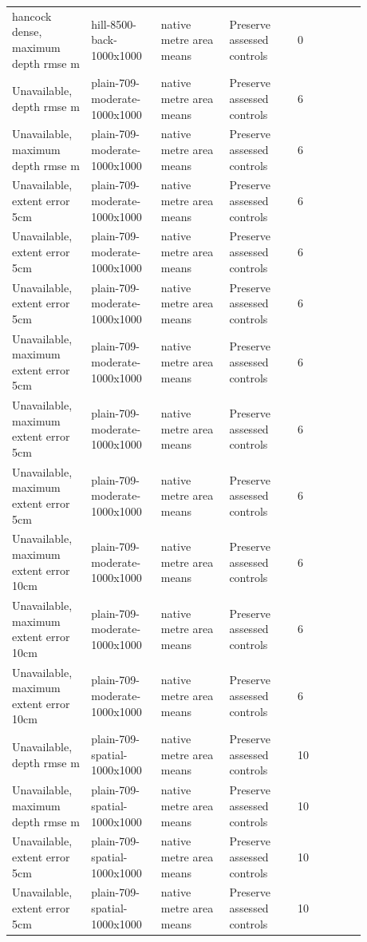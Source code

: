 \begin{longtable}{p{0.1760\linewidth}p{0.1760\linewidth}p{0.1760\linewidth}p{0.1760\linewidth}p{0.1760\linewidth}}
hancock dense, maximum depth rmse m & hill-8500-back-1000x1000 & native metre area means & Preserve assessed controls & 0 \\
Unavailable, depth rmse m & plain-709-moderate-1000x1000 & native metre area means & Preserve assessed controls & 6 \\
Unavailable, maximum depth rmse m & plain-709-moderate-1000x1000 & native metre area means & Preserve assessed controls & 6 \\
Unavailable, extent error 5cm & plain-709-moderate-1000x1000 & native metre area means & Preserve assessed controls & 6 \\
Unavailable, extent error 5cm & plain-709-moderate-1000x1000 & native metre area means & Preserve assessed controls & 6 \\
Unavailable, extent error 5cm & plain-709-moderate-1000x1000 & native metre area means & Preserve assessed controls & 6 \\
Unavailable, maximum extent error 5cm & plain-709-moderate-1000x1000 & native metre area means & Preserve assessed controls & 6 \\
Unavailable, maximum extent error 5cm & plain-709-moderate-1000x1000 & native metre area means & Preserve assessed controls & 6 \\
Unavailable, maximum extent error 5cm & plain-709-moderate-1000x1000 & native metre area means & Preserve assessed controls & 6 \\
Unavailable, maximum extent error 10cm & plain-709-moderate-1000x1000 & native metre area means & Preserve assessed controls & 6 \\
Unavailable, maximum extent error 10cm & plain-709-moderate-1000x1000 & native metre area means & Preserve assessed controls & 6 \\
Unavailable, maximum extent error 10cm & plain-709-moderate-1000x1000 & native metre area means & Preserve assessed controls & 6 \\
Unavailable, depth rmse m & plain-709-spatial-1000x1000 & native metre area means & Preserve assessed controls & 10 \\
Unavailable, maximum depth rmse m & plain-709-spatial-1000x1000 & native metre area means & Preserve assessed controls & 10 \\
Unavailable, extent error 5cm & plain-709-spatial-1000x1000 & native metre area means & Preserve assessed controls & 10 \\
Unavailable, extent error 5cm & plain-709-spatial-1000x1000 & native metre area means & Preserve assessed controls & 10 \\

\end{longtable}
